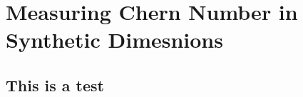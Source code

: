 \renewcommand{\thechapter}{7}

\chapter{Measuring Chern Number in Synthetic Dimesnions}

\section{This is a test}